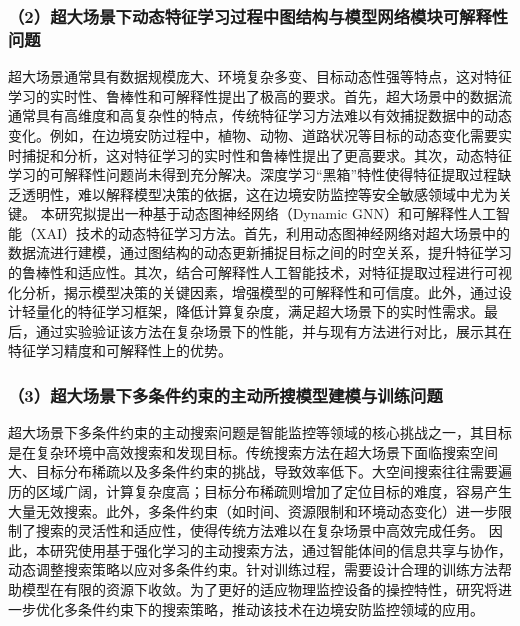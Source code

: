 \subsubsection*{\bfseries （2）超大场景下动态特征学习过程中图结构与模型网络模块可解释性问题}
超大场景通常具有数据规模庞大、环境复杂多变、目标动态性强等特点，这对特征学习的实时性、鲁棒性和可解释性提出了极高的要求。首先，超大场景中的数据流通常具有高维度和高复杂性的特点，传统特征学习方法难以有效捕捉数据中的动态变化。例如，在边境安防过程中，植物、动物、道路状况等目标的动态变化需要实时捕捉和分析，这对特征学习的实时性和鲁棒性提出了更高要求。其次，动态特征学习的可解释性问题尚未得到充分解决。深度学习“黑箱”特性使得特征提取过程缺乏透明性，难以解释模型决策的依据，这在边境安防监控等安全敏感领域中尤为关键。
本研究拟提出一种基于动态图神经网络（Dynamic GNN）和可解释性人工智能（XAI）技术的动态特征学习方法。首先，利用动态图神经网络对超大场景中的数据流进行建模，通过图结构的动态更新捕捉目标之间的时空关系，提升特征学习的鲁棒性和适应性。其次，结合可解释性人工智能技术，对特征提取过程进行可视化分析，揭示模型决策的关键因素，增强模型的可解释性和可信度。此外，通过设计轻量化的特征学习框架，降低计算复杂度，满足超大场景下的实时性需求。最后，通过实验验证该方法在复杂场景下的性能，并与现有方法进行对比，展示其在特征学习精度和可解释性上的优势。

\subsubsection*{\bfseries （3）超大场景下多条件约束的主动所搜模型建模与训练问题}

超大场景下多条件约束的主动搜索问题是智能监控等领域的核心挑战之一，其目标是在复杂环境中高效搜索和发现目标。传统搜索方法在超大场景下面临搜索空间大、目标分布稀疏以及多条件约束的挑战，导致效率低下。大空间搜索往往需要遍历的区域广阔，计算复杂度高；目标分布稀疏则增加了定位目标的难度，容易产生大量无效搜索。此外，多条件约束（如时间、资源限制和环境动态变化）进一步限制了搜索的灵活性和适应性，使得传统方法难以在复杂场景中高效完成任务。
因此，本研究使用基于强化学习的主动搜索方法，通过智能体间的信息共享与协作，动态调整搜索策略以应对多条件约束。针对训练过程，需要设计合理的训练方法帮助模型在有限的资源下收敛。为了更好的适应物理监控设备的操控特性，研究将进一步优化多条件约束下的搜索策略，推动该技术在边境安防监控领域的应用。